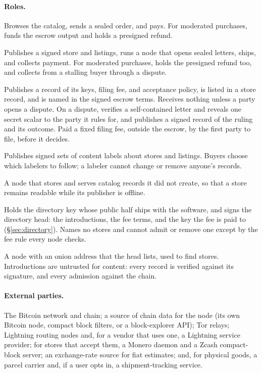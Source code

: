 \paragraph{Roles.}
\begin{description}[leftmargin=1.2em]
  \item[Buyer.] Browses the catalog, sends a sealed order, and pays. For moderated purchases, funds the escrow output and holds a presigned refund.
  \item[Vendor.] Publishes a signed store and listings, runs a node that opens sealed letters, ships, and collects payment. For moderated purchases, holds the presigned refund too, and collects from a stalling buyer through a dispute.
  \item[Moderator.] Publishes a record of its keys, filing fee, and acceptance policy, is listed in a store record, and is named in the signed escrow terms. Receives nothing unless a party opens a dispute. On a dispute, verifies a self-contained letter and reveals one secret scalar to the party it rules for, and publishes a signed record of the ruling and its outcome. Paid a fixed filing fee, outside the escrow, by the first party to file, before it decides.
  \item[Labeler.] Publishes signed sets of content labels about stores and listings. Buyers choose which labelers to follow; a labeler cannot change or remove anyone's records.
  \item[Replica.] A node that stores and serves catalog records it did not create, so that a store remains readable while its publisher is offline.
  \item[Directory operator.] Holds the directory key whose public half ships with the software, and signs the directory head: the introductions, the fee terms, and the key the fee is paid to (\S\ref{sec:directory}). Names no stores and cannot admit or remove one except by the fee rule every node checks.
  \item[Introduction.] A node with an onion address that the head lists, used to find stores. Introductions are untrusted for content: every record is verified against its signature, and every admission against the chain.
\end{description}

\paragraph{External parties.} The Bitcoin network and chain; a source of chain data for the node (its own Bitcoin node, compact block filters, or a block-explorer API); Tor relays; Lightning routing nodes and, for a vendor that uses one, a Lightning service provider; for stores that accept them, a Monero daemon and a Zcash compact-block server; an exchange-rate source for fiat estimates; and, for physical goods, a parcel carrier and, if a user opts in, a shipment-tracking service.

